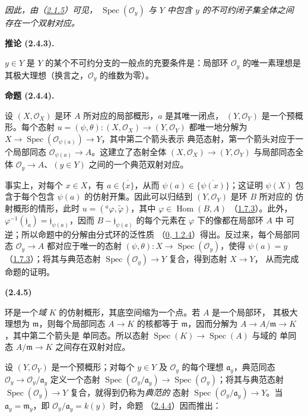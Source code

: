 \documentclass[UTF8,fontset=none,11pt,oneside,openany]{ctexbook}
\newenvironment{env}[1][]{%
  \par\medskip\noindent\textbf{(#1)}\ %
}{\par}
\newenvironment{proposition}[1][]{%
  \par\medskip\noindent\textbf{命题 (#1).}\ %
}{\par}
\newenvironment{corollary}[1][]{%
  \par\medskip\noindent\textbf{推论 (#1).}\ %
}{\par}
\let\EGAOriginalLabel\label
\renewcommand{\label}[1]{\phantomsection\EGAOriginalLabel{#1}}
\begin{document}
\emph{因此，由（\hyperref[I.2.1.5-fr]{2.1.5}）可见，
$\operatorname{Spec}(\mathscr{O}_y)$ 与 $Y$ 中包含 $y$ 的不可约闭子集全体之间
存在一个双射对应。}

\begin{corollary}[2.4.3]
\label{I.2.4.3-fr}
$y\in Y$ 是 $Y$ 的某个不可约分支的一般点的充要条件是：局部环
$\mathscr{O}_y$ 的唯一素理想是其极大理想（换言之，$\mathscr{O}_y$ 的维数为零）。
\end{corollary}

\begin{proposition}[2.4.4]
\label{I.2.4.4-fr}
设 $(X,\mathscr{O}_X)$ 是环 $A$ 所对应的局部概形，$a$ 是其唯一闭点，
$(Y,\mathscr{O}_Y)$ 是一个预概形。每个态射
$u=(\psi,\theta):(X,\mathscr{O}_X)\to(Y,\mathscr{O}_Y)$ 都唯一地分解为
$X\to\operatorname{Spec}(\mathscr{O}_{\psi(a)})\to Y$，其中第二个箭头表示
典范态射，第一个箭头对应于一个局部同态
$\mathscr{O}_{\psi(a)}\to A$。这建立了态射全体
$(X,\mathscr{O}_X)\to(Y,\mathscr{O}_Y)$ 与局部同态全体
$\mathscr{O}_y\to A$、$(y\in Y)$ 之间的一个典范双射对应。
\end{proposition}

事实上，对每个 $x\in X$，有 $a\in\overline{\{x\}}$，从而
$\psi(a)\in\overline{\{\psi(x)\}}$；这证明 $\psi(X)$ 包含于每个包含
$\psi(a)$ 的仿射开集。因此可以归结到 $(Y,\mathscr{O}_Y)$ 是环 $B$ 所对应的
仿射概形的情形，此时
$u=({}^a\varphi,\widetilde{\varphi})$，其中
$\varphi\in\operatorname{Hom}(B,A)$
（\hyperref[I.1.7.3-fr]{1.7.3}）。此外，
$\varphi^{-1}(\mathfrak{j}_a)=\mathfrak{j}_{\psi(a)}$，因而
$B-\mathfrak{j}_{\psi(a)}$ 的每个元素在 $\varphi$ 下的像都在局部环 $A$ 中
可逆；所以命题中的分解由分式环的泛性质
（\hyperref[0.1.2.4-fr]{0, 1.2.4}）得出。反过来，每个局部同态
$\mathscr{O}_y\to A$ 都对应于唯一的态射
$(\psi,\theta):X\to\operatorname{Spec}(\mathscr{O}_y)$，使得
$\psi(a)=y$（\hyperref[I.1.7.3-fr]{1.7.3}）；将其与典范态射
$\operatorname{Spec}(\mathscr{O}_y)\to Y$ 复合，得到态射 $X\to Y$，
从而完成命题的证明。

\begin{env}[2.4.5]
\label{I.2.4.5-fr}
环是一个\emph{域} $K$ 的仿射概形，其底空间缩为一个点。若 $A$ 是一个局部环，
其极大理想为 $\mathfrak{m}$，则每个局部同态 $A\to K$ 的核都等于
$\mathfrak{m}$，因而分解为 $A\to A/\mathfrak{m}\to K$，其中第二个箭头是
单同态。所以态射 $\operatorname{Spec}(K)\to\operatorname{Spec}(A)$ 与域的
单同态 $A/\mathfrak{m}\to K$ 之间存在双射对应。
\end{env}

设 $(Y,\mathscr{O}_Y)$ 是一个预概形；对每个 $y\in Y$ 及
$\mathscr{O}_y$ 的每个理想 $\mathfrak{a}_y$，典范同态
$\mathscr{O}_y\to\mathscr{O}_y/\mathfrak{a}_y$ 定义一个态射
$\operatorname{Spec}(\mathscr{O}_y/\mathfrak{a}_y)
\to\operatorname{Spec}(\mathscr{O}_y)$；将其与典范态射
$\operatorname{Spec}(\mathscr{O}_y)\to Y$ 复合，就得到仍称为\emph{典范的}
态射 $\operatorname{Spec}(\mathscr{O}_y/\mathfrak{a}_y)\to Y$。当
$\mathfrak{a}_y=\mathfrak{m}_y$，即
$\mathscr{O}_y/\mathfrak{a}_y=k(y)$ 时，命题
（\hyperref[I.2.4.4-fr]{2.4.4}）因而推出：
\end{document}
